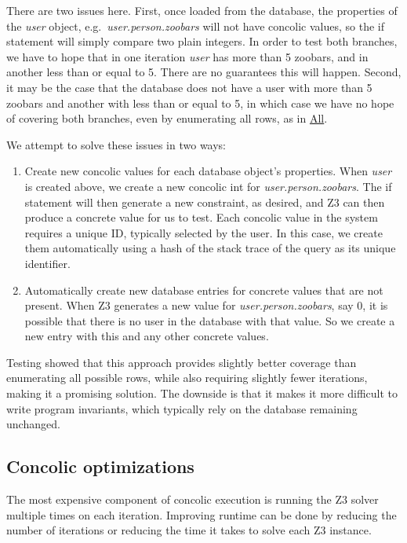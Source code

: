 \documentclass{scrartcl}
\begin{document}
\begin{enumerate}
  There are two issues here. First, once loaded from the database, the
  properties of the \textit{user} object, e.g.\ \textit{user.person.zoobars}
  will not have concolic values, so the if statement will simply compare
  two plain integers. In order to test both branches, we have to hope that
  in one iteration \textit{user} has more than 5 zoobars, and in another
  less than or equal to 5. There are no guarantees this will happen.
  Second, it may be the case that the database does not have a user
  with more than 5 zoobars and another with less than or equal to 5,
  in which case we have no hope of covering both branches, even by
  enumerating all rows, as in \underline{All}.

  We attempt to solve these issues in two ways:
  \begin{enumerate}
  \item Create new concolic values for each database object's
    properties. When \textit{user} is created above, we create a new
    concolic int for \textit{user.person.zoobars}. The if statement
    will then generate a new constraint, as desired, and Z3 can then
    produce a concrete value for us to test. Each concolic value in
    the system requires a unique ID, typically selected by the user.
    In this case, we create them automatically using a hash of the
    stack trace of the query as its unique identifier.

  \item Automatically create new database entries for concrete values
    that are not present. When Z3 generates a new value for
    \textit{user.person.zoobars}, say 0, it is possible that there is
    no user in the database with that value. So we create a new entry
    with this and any other concrete values.
  \end{enumerate}

  Testing showed that this approach provides slightly better coverage
  than enumerating all possible rows, while also requiring slightly
  fewer iterations, making it a promising solution. The downside is
  that it makes it more difficult to write program invariants, which
  typically rely on the database remaining unchanged.
\end{enumerate}

\subsection{Concolic optimizations}

The most expensive component of concolic execution is running the Z3
solver multiple times on each iteration. Improving runtime can be done
by reducing the number of iterations or reducing the time it takes to
solve each Z3 instance.
\end{document}
